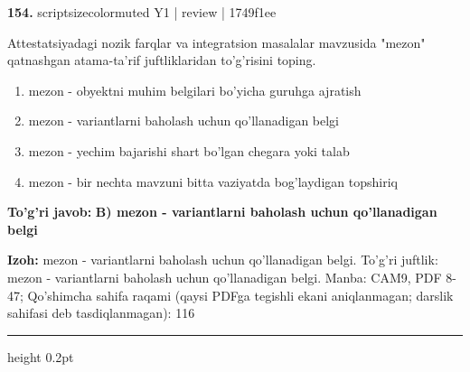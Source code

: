 \documentclass[10pt,a4paper]{article}
\begin{document}
{\bfseries\sffamily\color{ink} 154.} {scriptsizecolor{muted} Y1 | review | 1749f1ee}
\par
Attestatsiyadagi nozik farqlar va integratsion masalalar mavzusida "mezon" qatnashgan atama-ta'rif juftliklaridan to'g'risini toping.
\begin{enumerate}[label=\Alph*),leftmargin=9mm]
\item mezon - obyektni muhim belgilari bo'yicha guruhga ajratish
\item mezon - variantlarni baholash uchun qo'llanadigan belgi
\item mezon - yechim bajarishi shart bo'lgan chegara yoki talab
\item mezon - bir nechta mavzuni bitta vaziyatda bog'laydigan topshiriq
\end{enumerate}
\begin{tcolorbox}[enhanced,breakable,colback=teal!4,colframe=teal!60!black,boxrule=0.45pt,arc=1.2mm,left=2.7mm,right=2.7mm,top=1.8mm,bottom=1.8mm,before skip=2mm,after skip=2mm]
{\bfseries\sffamily\color{teal}To'g'ri javob:} \textbf{B) mezon - variantlarni baholash uchun qo'llanadigan belgi}
\par\smallskip
{\bfseries Izoh:} mezon - variantlarni baholash uchun qo'llanadigan belgi. To'g'ri juftlik: mezon - variantlarni baholash uchun qo'llanadigan belgi. Manba: CAM9, PDF 8-47; Qo'shimcha sahifa raqami (qaysi PDFga tegishli ekani aniqlanmagan; darslik sahifasi deb tasdiqlanmagan): 116
\end{tcolorbox}
\vspace{2mm}\hrule height 0.2pt\vspace{3mm}
\end{document}
